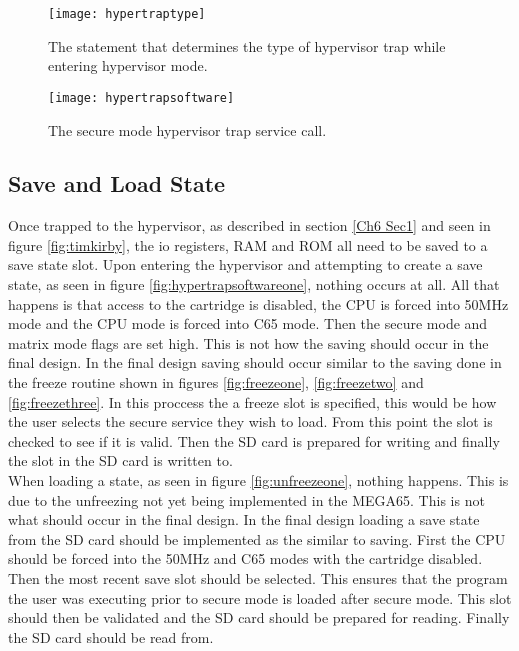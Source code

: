 \begin{figure}
  \centering
  \texttt{[image: hypertraptype]}
  \caption{The statement that determines the type of hypervisor trap while entering hypervisor mode.}
  \label{fig:hypertraptype}
\end{figure}

\begin{figure}
  \centering
  \texttt{[image: hypertrapsoftware]}
  \caption{The secure mode hypervisor trap service call.}
  \label{fig:hypertrapsoftware}
\end{figure}


\subsection{Save and Load State}

\label{Ch6 Sec3 Sub2}

Once trapped to the hypervisor, as described in section \ref{Ch6 Sec1} and seen in figure \ref{fig:timkirby}, the io registers, RAM and ROM all need to be saved to a save state slot.
Upon entering the hypervisor and attempting to create a save state, as seen in figure \ref{fig:hypertrapsoftwareone}, nothing occurs at all. All that happens is that access to the cartridge is disabled, the CPU is forced into 50MHz mode and the CPU mode is forced into C65 mode. Then the secure mode and matrix mode flags are set high. This is not how the saving should occur in the final design. In the final design saving should occur similar to the saving done in the freeze routine shown in figures \ref{fig:freezeone}, \ref{fig:freezetwo} and \ref{fig:freezethree}. In this proccess the a freeze slot is specified, this would be how the user selects the secure service they wish to load. From this point the slot is checked to see if it is valid. Then the SD card is prepared for writing and finally the slot in the SD card is written to.\\

When loading a state, as seen in figure \ref{fig:unfreezeone}, nothing happens. This is due to the unfreezing not yet being implemented in the MEGA65. This is not what should occur in the final design. In the final design loading a save state from the SD card should be implemented as the similar to saving. First the CPU should be forced into the 50MHz and C65 modes with the cartridge disabled. Then the most recent save slot should be selected. This ensures that the program the user was executing prior to secure mode is loaded after secure mode. This slot should then be validated and the SD card should be prepared for reading. Finally the SD card should be read from.

